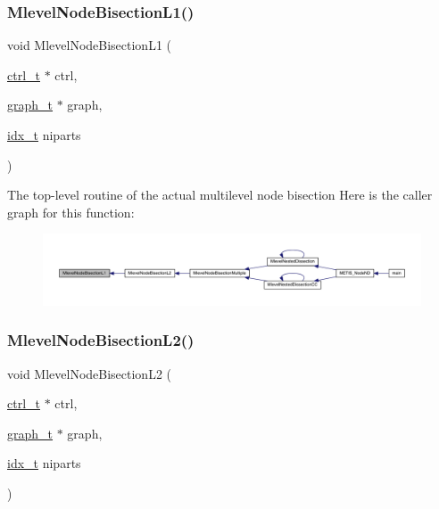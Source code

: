 \subsubsection{\texorpdfstring{Mlevel\+Node\+Bisection\+L1()}{MlevelNodeBisectionL1()}}
{\footnotesize\ttfamily void Mlevel\+Node\+Bisection\+L1 (\begin{DoxyParamCaption}\item[{\hyperlink{a00742}{ctrl\+\_\+t} $\ast$}]{ctrl,  }\item[{\hyperlink{a00734}{graph\+\_\+t} $\ast$}]{graph,  }\item[{\hyperlink{a00876_aaa5262be3e700770163401acb0150f52}{idx\+\_\+t}}]{niparts }\end{DoxyParamCaption})}

The top-\/level routine of the actual multilevel node bisection Here is the caller graph for this function\+:\nopagebreak
\begin{figure}[H]
\begin{center}
\leavevmode
\includegraphics[width=350pt]{a00945_aeeaa7f4ed9878ae2f7faff0e2402fd87_icgraph}
\end{center}
\end{figure}
\mbox{\label{a00945_ac3a0eaeefa34a3865a0be5bb70bd958f}} 
\subsubsection{\texorpdfstring{Mlevel\+Node\+Bisection\+L2()}{MlevelNodeBisectionL2()}}
{\footnotesize\ttfamily void Mlevel\+Node\+Bisection\+L2 (\begin{DoxyParamCaption}\item[{\hyperlink{a00742}{ctrl\+\_\+t} $\ast$}]{ctrl,  }\item[{\hyperlink{a00734}{graph\+\_\+t} $\ast$}]{graph,  }\item[{\hyperlink{a00876_aaa5262be3e700770163401acb0150f52}{idx\+\_\+t}}]{niparts }\end{DoxyParamCaption})}

